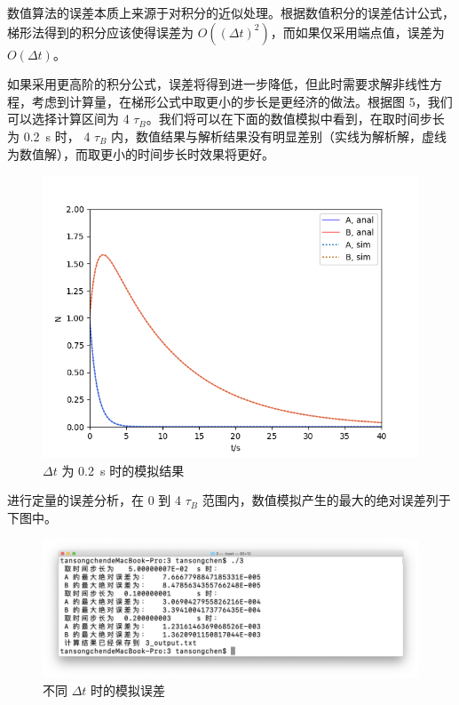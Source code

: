 \documentclass{ctexart}
\begin{document}
数值算法的误差本质上来源于对积分的近似处理。根据数值积分的误差估计公式，梯形法得到的积分应该使得误差为 $O((\Delta t)^2)$，而如果仅采用端点值，误差为 $O(\Delta t)$。

如果采用更高阶的积分公式，误差将得到进一步降低，但此时需要求解非线性方程，考虑到计算量，在梯形公式中取更小的步长是更经济的做法。根据图 5，我们可以选择计算区间为 4 $\tau_B$。我们将可以在下面的数值模拟中看到，在取时间步长为 0.2~s 时， 4 $\tau_B$ 内，数值结果与解析结果没有明显差别（实线为解析解，虚线为数值解），而取更小的时间步长时效果将更好。

\begin{figure}[h]
\centering
\includegraphics[scale = 0.5]{sim.png}
\caption{$\Delta t$ 为 0.2~s 时的模拟结果}
\end{figure}

进行定量的误差分析，在 0 到 4 $\tau_B$ 范围内，数值模拟产生的最大的绝对误差列于下图中。

\begin{figure}[h]
\centering
\includegraphics[scale = 0.3]{error.png}
\caption{不同 $\Delta t$ 时的模拟误差}
\end{figure}
\end{document}
